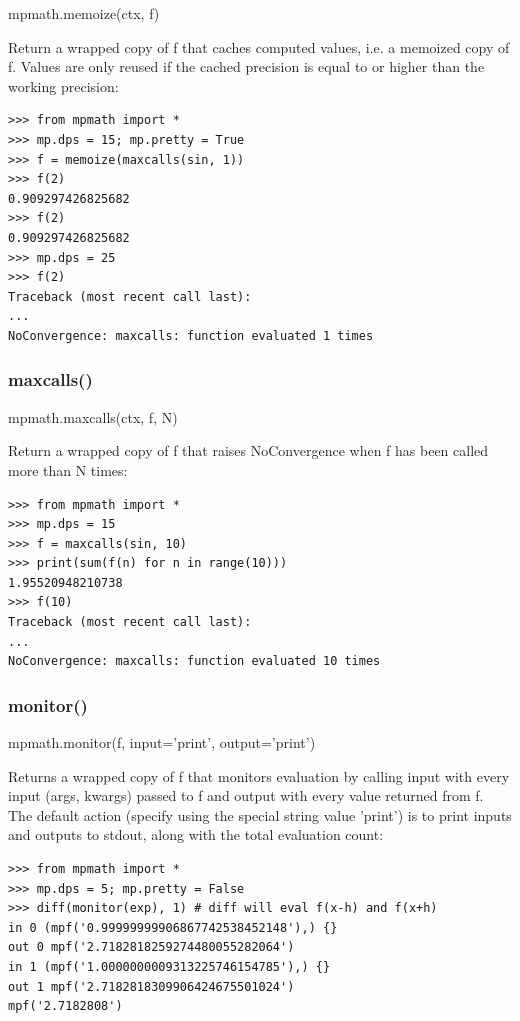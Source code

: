 mpmath.memoize(ctx, f)

\vpara
Return a wrapped copy of f that caches computed values, i.e. a memoized copy of f. Values are only reused if the cached precision is equal to or higher than the working precision:

\begin{lstlisting}
>>> from mpmath import *
>>> mp.dps = 15; mp.pretty = True
>>> f = memoize(maxcalls(sin, 1))
>>> f(2)
0.909297426825682
>>> f(2)
0.909297426825682
>>> mp.dps = 25
>>> f(2)
Traceback (most recent call last):
...
NoConvergence: maxcalls: function evaluated 1 times
\end{lstlisting}


\subsubsection{maxcalls()}

mpmath.maxcalls(ctx, f, N)

\vpara
Return a wrapped copy of f that raises NoConvergence when f has been called more than N times:

\begin{lstlisting}
>>> from mpmath import *
>>> mp.dps = 15
>>> f = maxcalls(sin, 10)
>>> print(sum(f(n) for n in range(10)))
1.95520948210738
>>> f(10)
Traceback (most recent call last):
...
NoConvergence: maxcalls: function evaluated 10 times
\end{lstlisting}


\subsubsection{monitor()}

mpmath.monitor(f, input='print', output='print')

\vpara
Returns a wrapped copy of f that monitors evaluation by calling input with every input (args, kwargs) passed to f and output with every value returned from f. The default action (specify using the special string value 'print') is to print inputs and outputs to stdout, along with the total evaluation count:

\begin{lstlisting}
>>> from mpmath import *
>>> mp.dps = 5; mp.pretty = False
>>> diff(monitor(exp), 1) # diff will eval f(x-h) and f(x+h)
in 0 (mpf('0.99999999906867742538452148'),) {}
out 0 mpf('2.7182818259274480055282064')
in 1 (mpf('1.0000000009313225746154785'),) {}
out 1 mpf('2.7182818309906424675501024')
mpf('2.7182808')
\end{lstlisting}


